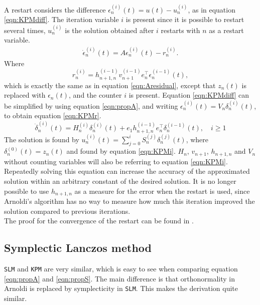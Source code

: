 A restart considers the difference $\epsilon_n^{(i)}(t) = u(t)-u_n^{(i)}$, as in equation \eqref{eqn:KPMdiff}. The iteration variable $i$ is present since it is possible to restart several times, $u_n^{(i)}$ is the solution obtained after $i$ restarts with $n$ as a restart variable. 
\begin{equation}
\begin{aligned}
\dot{\epsilon}_n^{(i)}(t)=A \epsilon_n^{(i)} (t)  - r_n^{(i)}.
\end{aligned}
\label{eqn:KPMdiff}
\end{equation}
Where 
\begin{equation*}
r_n^{(i)} = h_{n+1,n}^{(i-1)} v_{n+1}^{(i-1)} e_n^{\top} \epsilon_n^{(i-1)} (t),
\end{equation*}
which is exactly the same as in equation \eqref{eqn:Aresidual}, except that $z_n(t)$ is replaced with $\epsilon_n(t)$, and the counter $i$ is present. 
Equation \eqref{eqn:KPMdiff} can be simplified by using equation \eqref{eqn:propA}, and writing $ \epsilon^{(i)}_n(t)  = V_n \delta_n^{(i)}(t) $, to obtain equation \eqref{eqn:KPMr}.
\begin{equation}
\dot{\delta}^{(i)}_n(t) = H_n^{(i)} \delta_n^{(i)}(t) + e_1 h_{n+1,n}^{(i-1)} e^\top_n \delta_n^{(i-1)}(t), \quad i \geq 1
\label{eqn:KPMr}
\end{equation}
The solution is found by $ u_n^{(i)}(t) = \sum \limits_{j = 0} ^i S_n^{(j)} \delta_n^{(j)} (t) $, where $\delta_n^{(0)} (t) = z_n(t)$ and found by equation \eqref{eqn:KPMi}. $H_n$, $v_{n+1}$, $h_{n+1,n}$ and $V_n$ without counting variables will also be referring to equation \eqref{eqn:KPMi}. \\
Repeatedly solving this equation can increase the accuracy of the approximated solution within an arbitrary constant of the desired solution. It is no longer possible to use $h_{n+1,n}$ as a measure for the error when the restart is used, since Arnoldi's algorithm has no way to measure how much this iteration improved the solution compared to previous iterations.\\

The proof for the convergence of the restart can be found in \cite{elenaconv}.\\
\subsection{Symplectic Lanczos method}
\texttt{SLM} and \texttt{KPM} are very similar, which is easy to see when comparing equation \eqref{eqn:propA} and \eqref{eqn:propS}. The main difference is that orthonormality in Arnoldi is replaced by symplecticity in \texttt{SLM}. This makes the derivation quite similar.\\

